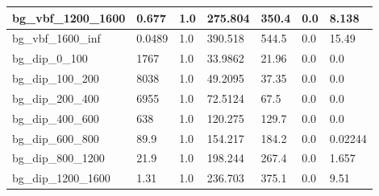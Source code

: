\documentclass[a4paper, 10pt]{article}
\begin{document}
\begin{table}[H]
\begin{center}
\begin{tabular}{|m{23.0mm}|m{23.0mm}|m{18.0mm}|m{19.0mm}|m{19.0mm}|m{19.0mm}|m{19.0mm}|}
      \hline
      {\cellcolor{white}         bg\_vbf\_1200\_1600}& {\cellcolor{white}         0.677}& {\cellcolor{white}         1.0}& {\cellcolor{white}         275.804}& {\cellcolor{white}         350.4}& {\cellcolor{orange}         0.0}& {\cellcolor{orange}         8.138}\\
      \hline
      {\cellcolor{white}         bg\_vbf\_1600\_inf}& {\cellcolor{white}         0.0489}& {\cellcolor{white}         1.0}& {\cellcolor{white}         390.518}& {\cellcolor{white}         544.5}& {\cellcolor{red}         0.0}& {\cellcolor{red}         15.49}\\
      \hline
      {\cellcolor{white}         bg\_dip\_0\_100}& {\cellcolor{white}         1767}& {\cellcolor{white}         1.0}& {\cellcolor{white}         33.9862}& {\cellcolor{white}         21.96}& {\cellcolor{green}         0.0}& {\cellcolor{green}         0.0}\\
      \hline
      {\cellcolor{white}         bg\_dip\_100\_200}& {\cellcolor{white}         8038}& {\cellcolor{white}         1.0}& {\cellcolor{white}         49.2095}& {\cellcolor{white}         37.35}& {\cellcolor{green}         0.0}& {\cellcolor{green}         0.0}\\
      \hline
      {\cellcolor{white}         bg\_dip\_200\_400}& {\cellcolor{white}         6955}& {\cellcolor{white}         1.0}& {\cellcolor{white}         72.5124}& {\cellcolor{white}         67.5}& {\cellcolor{green}         0.0}& {\cellcolor{green}         0.0}\\
      \hline
      {\cellcolor{white}         bg\_dip\_400\_600}& {\cellcolor{white}         638}& {\cellcolor{white}         1.0}& {\cellcolor{white}         120.275}& {\cellcolor{white}         129.7}& {\cellcolor{green}         0.0}& {\cellcolor{green}         0.0}\\
      \hline
      {\cellcolor{white}         bg\_dip\_600\_800}& {\cellcolor{white}         89.9}& {\cellcolor{white}         1.0}& {\cellcolor{white}         154.217}& {\cellcolor{white}         184.2}& {\cellcolor{green}         0.0}& {\cellcolor{green}         0.02244}\\
      \hline
      {\cellcolor{white}         bg\_dip\_800\_1200}& {\cellcolor{white}         21.9}& {\cellcolor{white}         1.0}& {\cellcolor{white}         198.244}& {\cellcolor{white}         267.4}& {\cellcolor{green}         0.0}& {\cellcolor{green}         1.657}\\
      \hline
      {\cellcolor{white}         bg\_dip\_1200\_1600}& {\cellcolor{white}         1.31}& {\cellcolor{white}         1.0}& {\cellcolor{white}         236.703}& {\cellcolor{white}         375.1}& {\cellcolor{orange}         0.0}& {\cellcolor{orange}         9.51}\\

\end{tabular}
\end{center}
\end{table}
\end{document}
